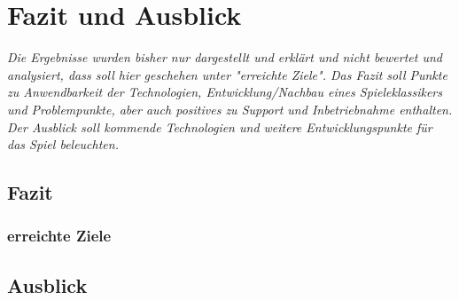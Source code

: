 \chapter{Fazit und Ausblick}
\label{cha:fazit}

\emph{Die Ergebnisse wurden bisher nur dargestellt und erklärt und nicht bewertet und analysiert, dass soll hier geschehen unter "erreichte Ziele". Das Fazit soll Punkte zu Anwendbarkeit der Technologien, Entwicklung/Nachbau eines Spieleklassikers und Problempunkte, aber auch positives zu Support und Inbetriebnahme enthalten. Der Ausblick soll kommende Technologien und weitere Entwicklungspunkte für das Spiel beleuchten.}

\section{Fazit}
\label{sec:Schlussfolgerung}

\subsection{erreichte Ziele}
\label{subsec:erreichte_ziele}

\section{Ausblick}
\label{sec:Ausblick}
